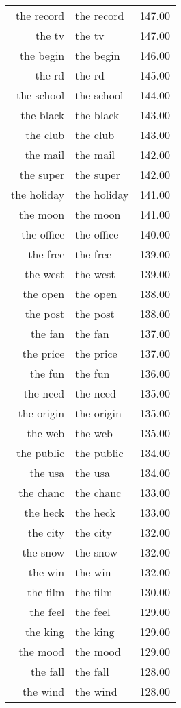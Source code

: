 \begin{table}[ht]
\begin{tabular}{rlr}
  the record & the record & 147.00 \\ 
  the tv & the tv & 147.00 \\ 
  the begin & the begin & 146.00 \\ 
  the rd & the rd & 145.00 \\ 
  the school & the school & 144.00 \\ 
  the black & the black & 143.00 \\ 
  the club & the club & 143.00 \\ 
  the mail & the mail & 142.00 \\ 
  the super & the super & 142.00 \\ 
  the holiday & the holiday & 141.00 \\ 
  the moon & the moon & 141.00 \\ 
  the office & the office & 140.00 \\ 
  the free & the free & 139.00 \\ 
  the west & the west & 139.00 \\ 
  the open & the open & 138.00 \\ 
  the post & the post & 138.00 \\ 
  the fan & the fan & 137.00 \\ 
  the price & the price & 137.00 \\ 
  the fun & the fun & 136.00 \\ 
  the need & the need & 135.00 \\ 
  the origin & the origin & 135.00 \\ 
  the web & the web & 135.00 \\ 
  the public & the public & 134.00 \\ 
  the usa & the usa & 134.00 \\ 
  the chanc & the chanc & 133.00 \\ 
  the heck & the heck & 133.00 \\ 
  the city & the city & 132.00 \\ 
  the snow & the snow & 132.00 \\ 
  the win & the win & 132.00 \\ 
  the film & the film & 130.00 \\ 
  the feel & the feel & 129.00 \\ 
  the king & the king & 129.00 \\ 
  the mood & the mood & 129.00 \\ 
  the fall & the fall & 128.00 \\ 
  the wind & the wind & 128.00 \\ 

\end{tabular}
\end{table}
